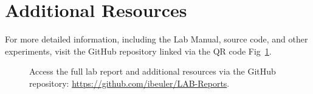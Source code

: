 \documentclass[journal]{IEEEtran}
\begin{document}
\section{Additional Resources}
For more detailed information, including the Lab Manual, source code, and other experiments, visit the GitHub repository linked via the QR code Fig~\ref{fig:qr}.

\begin{figure}[H]
    \centering
    \caption{Access the full lab report and additional resources via the GitHub repository: 
    \href{https://github.com/ibeuler/LAB-Reports}{\url{https://github.com/ibeuler/LAB-Reports}}.}
    \label{fig:qr}
\end{figure}
\end{document}
